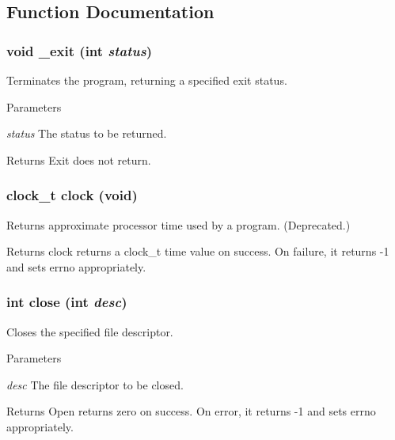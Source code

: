 \subsection{Function Documentation}
\hypertarget{group__syscalls_gabc96bd69b58b2deaddb484478d911c1b}{
\subsubsection[{\_\-exit}]{\setlength{\rightskip}{0pt plus 5cm}void \_\-exit (int {\em status})}}
\label{group__syscalls_gabc96bd69b58b2deaddb484478d911c1b}
Terminates the program, returning a specified exit status. 
\begin{DoxyParams}{Parameters}
\item[{\em status}]The status to be returned. \end{DoxyParams}
\begin{DoxyReturn}{Returns}
Exit does not return. 
\end{DoxyReturn}
\hypertarget{group__syscalls_gade863cfcca9ee19f20ca95796f8ddc1e}{
\subsubsection[{clock}]{\setlength{\rightskip}{0pt plus 5cm}clock\_\-t clock (void)}}
\label{group__syscalls_gade863cfcca9ee19f20ca95796f8ddc1e}
Returns approximate processor time used by a program. (Deprecated.) \begin{DoxyReturn}{Returns}
clock returns a clock\_\-t time value on success. On failure, it returns -\/1 and sets errno appropriately. 
\end{DoxyReturn}
\hypertarget{group__syscalls_gab919bda3c5fc0afcf6e3417b840da6e9}{
\subsubsection[{close}]{\setlength{\rightskip}{0pt plus 5cm}int close (int {\em desc})}}
\label{group__syscalls_gab919bda3c5fc0afcf6e3417b840da6e9}
Closes the specified file descriptor. 
\begin{DoxyParams}{Parameters}
\item[{\em desc}]The file descriptor to be closed. \end{DoxyParams}
\begin{DoxyReturn}{Returns}
Open returns zero on success. On error, it returns -\/1 and sets errno appropriately. 
\end{DoxyReturn}
